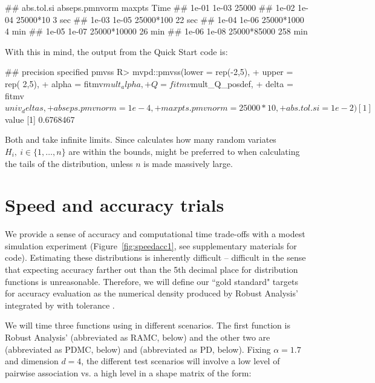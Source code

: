 \begin{example}
## abs.tol.si    abseps.pmnvorm   maxpts         Time
## 1e-01         1e-03            25000
## 1e-02         1e-04            25000*10        3 sec
## 1e-03         1e-05            25000*100      22 sec
## 1e-04         1e-06            25000*1000      4 min
## 1e-05         1e-07            25000*10000    26 min
## 1e-06         1e-08            25000*85000   258 min
\end{example}

With this in mind, the output from the Quick Start code is:

\begin{example}
  ## precision specified pmvss
  R> mvpd::pmvss(lower = rep(-2,5),
  +              upper = rep( 2,5),
  +              alpha = fitmv$mult_alpha,
  +              Q = fitmv$mult_Q_posdef,
  +              delta = fitmv$univ_deltas,
  +              abseps.pmvnorm = 1e-4,
  +              maxpts.pmvnorm = 25000*10,
  +              abs.tol.si = 1e-2)[1]
  $value
  [1] 0.6768467
\end{example}


Both  and  take infinite limits. Since
 calculates how many random variates
$H_i,~ i \in \{1,\dots,n\}$ are within the bounds,  might
be preferred to  when calculating the tails of the
distribution, unless $n$ is made massively large.






\section{Speed and accuracy trials \label{sect:acctime:setup}}


We provide a sense of accuracy and computational time trade-offs with a
modest simulation experiment (Figure~\ref{fig:speedacc1}, see
supplementary materials for code).  Estimating these distributions is
inherently difficult -- difficult in the sense that expecting accuracy
farther out than the 5th decimal place for distribution functions is
unreasonable.  Therefore, we will define our ``gold standard" targets
for accuracy evaluation as the numerical density produced by Robust
Analysis'  integrated by 
with tolerance .


We will time three functions using  in different
scenarios.  The first function is Robust Analysis'
 (abbreviated as RAMC, below) and the other two are
 (abbreviated as PDMC, below) and
 (abbreviated as PD, below).  Fixing $\alpha=1.7$ and
dimension $d=4$, the different test scenarios will involve a low level
of pairwise association vs. a high level in a shape matrix of the
form:

